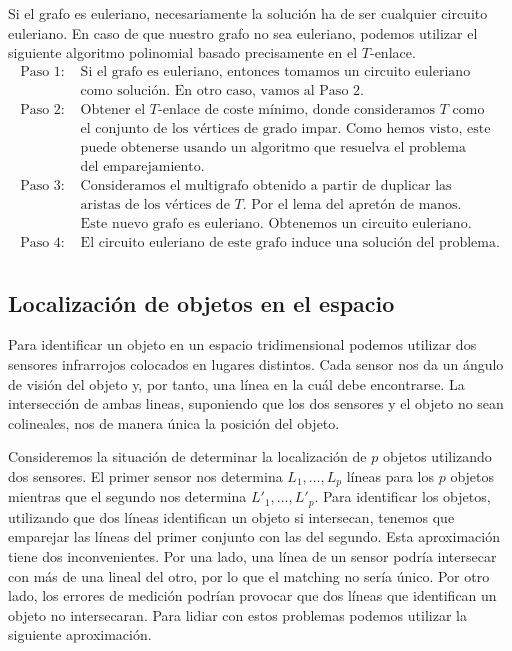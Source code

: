\documentclass[twoside,a4paper,openright,12pt,tikz]{book}
\begin{document}
Si el grafo es euleriano, necesariamente la solución ha de ser cualquier circuito euleriano. En caso de que nuestro grafo no sea euleriano, podemos utilizar el siguiente algoritmo polinomial basado precisamente en el $T$-enlace.
\begin{align*}
\text{Paso 1: }& \text{Si el grafo es euleriano, entonces tomamos un circuito euleriano}\\
&\text{como solución. En otro caso, vamos al Paso 2.}\\
\text{Paso 2: }&\text{Obtener el $T$-enlace de coste mínimo, donde consideramos $T$ como}\\
&\text{el conjunto de los vértices de grado impar. Como hemos visto, este}\\
&\text{puede obtenerse usando un algoritmo que resuelva el problema}\\
&\text{del emparejamiento.}\\
\text{Paso 3: }&\text{Consideramos el multigrafo obtenido a partir de duplicar las}\\
&\text{aristas de los vértices de $T$. Por el lema del apretón de manos.}\\
&\text{Este nuevo grafo es euleriano. Obtenemos un circuito euleriano.}\\
\text{Paso 4: }& \text{El circuito euleriano de este grafo induce una solución del problema.}\\
\end{align*} 

\subsection{Localización de objetos en el espacio}
Para identificar un objeto en un espacio tridimensional podemos utilizar dos sensores infrarrojos colocados en lugares distintos. Cada sensor nos da un ángulo de visión del objeto y, por tanto, una línea en la cuál debe encontrarse. La intersección de ambas lineas, suponiendo que los dos sensores y el objeto no sean colineales, nos de manera única la posición del objeto. 

Consideremos la situación de determinar la localización de $p$ objetos utilizando dos sensores. El primer sensor nos determina $L_1,\dotsc,L_p$ líneas para los $p$ objetos mientras que el segundo nos determina $L'_1,\dotsc,L'_p$. Para identificar los objetos, utilizando que dos líneas identifican un objeto si intersecan, tenemos que emparejar las líneas del primer conjunto con las del segundo. Esta aproximación tiene dos inconvenientes. Por una lado, una línea de un sensor podría intersecar con más de una lineal del otro, por lo que el matching no sería único. Por otro lado, los errores de medición podrían provocar que dos líneas que identifican un objeto no intersecaran. Para lidiar con estos problemas podemos utilizar la siguiente aproximación. 
\end{document}
